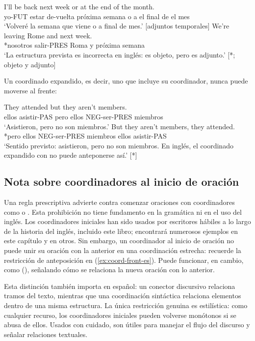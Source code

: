 \ea \label{ex:coordinate-function-es}
    \ea \gll I'll be back next week or at the end of the month.\\
        yo-FUT estar de-vuelta próxima semana o a el final de el mes\\
    \glt `Volveré la semana que viene o a final de mes.' [adjuntos temporales]
    \ex \gll *We're leaving Rome and next week.\\
        *nosotros salir-PRES Roma y próxima semana\\
    \glt `La estructura prevista es incorrecta en inglés:  es objeto, pero  es adjunto.' [*; objeto y adjunto]
    \z
\z

Un coordinado expandido, es decir, uno que incluye su coordinador, nunca puede moverse al frente:

\ea \label{ex:coord-front-es}
    \ea \gll They attended but they aren't members.\\
        ellos asistir-PAS pero ellos NEG-ser-PRES miembros\\
    \glt `Asistieron, pero no son miembros.'
    \ex \gll *But they aren't members, they attended.\\
        *pero ellos NEG-ser-PRES miembros ellos asistir-PAS\\
    \glt `Sentido previsto: asistieron, pero no son miembros. En inglés, el coordinado expandido con  no puede anteponerse así.' [*]
    \z
\z

\subsection{Nota sobre coordinadores al inicio de oración}

Una regla prescriptiva advierte contra comenzar oraciones con coordinadores como  o . Esta prohibición no tiene fundamento en la gramática ni en el uso del inglés. Los coordinadores iniciales han sido usados por escritores hábiles a lo largo de la historia del inglés, incluido este libro; encontrará numerosos ejemplos en este capítulo y en otros. Sin embargo, un coordinador al inicio de oración no puede unir su oración con la anterior en una coordinación estrecha: recuerde la restricción de anteposición en (\ref{ex:coord-front-es}). Puede funcionar, en cambio, como  (), señalando cómo se relaciona la nueva oración con lo anterior.

Esta distinción también importa en español: un conector discursivo relaciona tramos del texto, mientras que una coordinación sintáctica relaciona elementos dentro de una misma estructura. La única restricción genuina es estilística: como cualquier recurso, los coordinadores iniciales pueden volverse monótonos si se abusa de ellos. Usados con cuidado, son útiles para manejar el flujo del discurso y señalar relaciones textuales.

